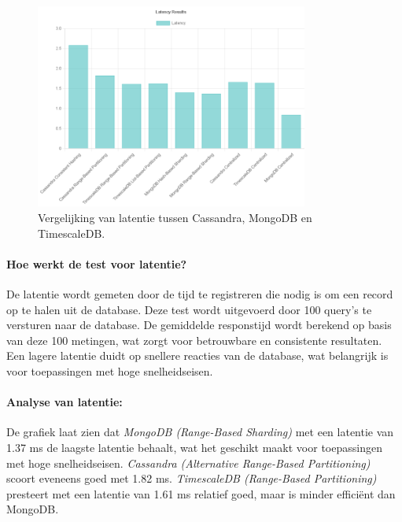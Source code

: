\begin{figure}[H]
	\centering
	\includegraphics[width=0.8\textwidth]{Latency.png}
	\caption{Vergelijking van latentie tussen Cassandra, MongoDB en TimescaleDB.}
	\label{fig:latency-comparison}
\end{figure}

\paragraph{Hoe werkt de test voor latentie?} 
De latentie wordt gemeten door de tijd te registreren die nodig is om een record op te halen uit de database. Deze test wordt uitgevoerd door 100 query's te versturen naar de database. De gemiddelde responstijd wordt berekend op basis van deze 100 metingen, wat zorgt voor betrouwbare en consistente resultaten. Een lagere latentie duidt op snellere reacties van de database, wat belangrijk is voor toepassingen met hoge snelheidseisen.

\paragraph{Analyse van latentie:}
De grafiek laat zien dat \textit{MongoDB (Range-Based Sharding)} met een latentie van 1.37 ms de laagste latentie behaalt, wat het geschikt maakt voor toepassingen met hoge snelheidseisen. \textit{Cassandra (Alternative Range-Based Partitioning)} scoort eveneens goed met 1.82 ms. \textit{TimescaleDB (Range-Based Partitioning)} presteert met een latentie van 1.61 ms relatief goed, maar is minder efficiënt dan MongoDB.

